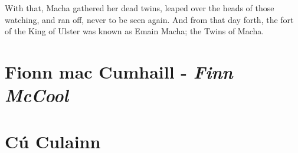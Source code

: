 \documentclass[colorlinks,12pt,a4paper,normalphoto,withhyper,ragged2e]{altareport}
\begin{document}
With that, Macha gathered her dead twins, leaped over the heads of those watching, and ran off, never to be seen again. And from that day forth, the fort of the King of Ulster was known as Emain Macha; the Twins of Macha.




\section{Fionn mac Cumhaill - \textit{Finn McCool}}




\section{Cú Culainn}





%
%
\end{document}
